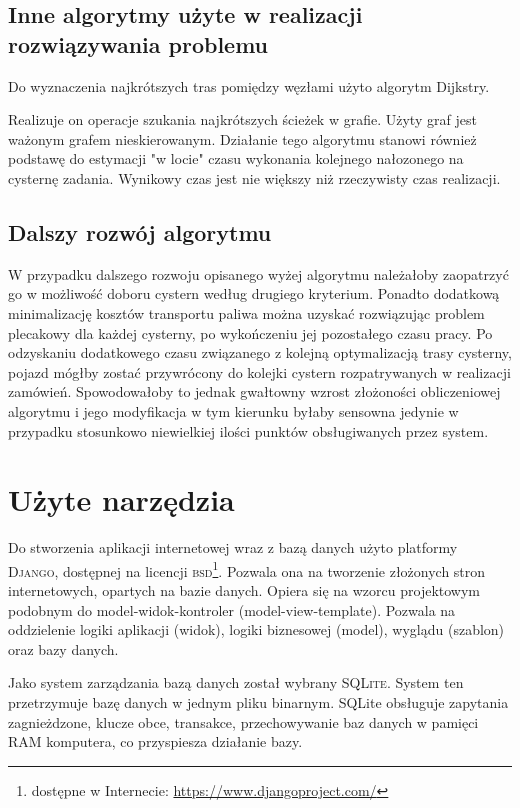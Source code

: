 \documentclass[11pt,a4paper,oneside]{mwart}
\begin{document}
\subsection{Inne algorytmy użyte w realizacji rozwiązywania problemu}
	Do wyznaczenia najkrótszych tras pomiędzy węzłami użyto algorytm Dijkstry.

	Realizuje on operacje szukania najkrótszych ścieżek w grafie. Użyty graf jest ważonym grafem nieskierowanym. Działanie tego algorytmu stanowi również podstawę do estymacji "w locie" czasu wykonania kolejnego nałozonego na cysternę zadania.	Wynikowy czas jest nie większy niż rzeczywisty czas realizacji.

  \subsection{Dalszy rozwój algorytmu}

	W przypadku dalszego rozwoju opisanego wyżej algorytmu należałoby zaopatrzyć go w możliwość doboru cystern według drugiego kryterium. Ponadto dodatkową minimalizację kosztów transportu paliwa można uzyskać rozwiązując problem plecakowy dla każdej cysterny, po wykończeniu jej pozostałego czasu pracy. Po odzyskaniu dodatkowego czasu związanego z kolejną optymalizacją trasy cysterny, pojazd mógłby zostać przywrócony do kolejki cystern rozpatrywanych w realizacji zamówień. Spowodowałoby to jednak gwałtowny wzrost złożoności obliczeniowej algorytmu i jego modyfikacja w tym kierunku byłaby sensowna jedynie w przypadku stosunkowo niewielkiej ilości punktów obsługiwanych przez system.


 
\section{Użyte narzędzia}
Do stworzenia aplikacji internetowej wraz z bazą danych użyto platformy \textsc{Django}, dostępnej na licencji \textsc{bsd}\footnote{dostępne w Internecie: \url{https://www.djangoproject.com/}}. Pozwala ona na tworzenie złożonych stron internetowych, opartych na bazie danych. Opiera się na wzorcu projektowym podobnym do model-widok-kontroler (model-view-template). Pozwala na oddzielenie logiki aplikacji (widok), logiki biznesowej (model), wyglądu (szablon) oraz bazy danych.

Jako system zarządzania bazą danych został wybrany \textsc{SQLite}. System ten przetrzymuje bazę danych w jednym pliku binarnym.
SQLite obsługuje zapytania zagnieżdzone, klucze obce, transakce, przechowywanie baz danych w pamięci RAM komputera, co przyspiesza działanie bazy.
\end{document}
